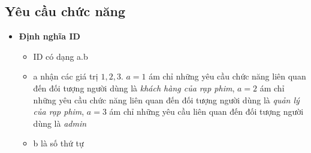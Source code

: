 \documentclass[a4paper, 12pt]{article}
\begin{document}
    \subsection{Yêu cầu chức năng}
    \begin{itemize}
        \item \textbf{Định nghĩa ID}
        \begin{itemize}
            \item ID có dạng a.b
            \item a nhận các giá trị $1, 2, 3$. $a = 1$ ám chỉ những yêu cầu chức năng liên quan đến đối tượng người dùng là \textit{khách hàng của rạp phim}, $a = 2$ ám chỉ những yêu cầu chức năng liên quan đến đối tượng người dùng là \textit{quản lý của rạp phim}, $a = 3$ ám chỉ những yêu cầu liên quan đến đối tượng người dùng là \textit{admin}
            \item b là số thứ tự
        \end{itemize}


\end{itemize}
\end{document}
